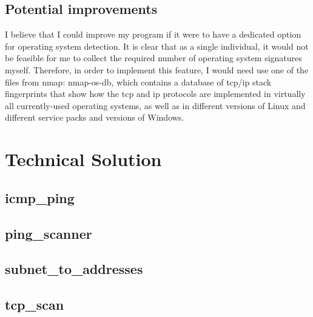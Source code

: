 \documentclass[titlepage]{article}
\let\Oldsection\section{}
\renewcommand{\section}{\clearpage\FloatBarrier\Oldsection}
\let\Oldsubsection\subsection{}
\renewcommand{\subsection}{\FloatBarrier\Oldsubsection}
\begin{document}
\subsection{Potential improvements}
I believe that I could improve my program if it were to have a dedicated option for operating
system detection. 
It is clear that as a single individual, it would not be feasible for me to collect the required
number of operating system signatures myself. Therefore, in order to implement this feature,
I would need use one of the files from nmap: nmap-os-db, which contains
a database of \gls{tcp}/\gls{ip} stack fingerprints that show how the \gls{tcp} and \gls{ip}
protocols are implemented in virtually all currently-used operating systems, as well as in different
versions of Linux and different service packs and versions of Windows.

\appendix

\section{Technical Solution}\label{code}
\lstset{language=Python}
\subsection{icmp\_ping}\label{app:icmpping}



\subsection{ping\_scanner}\label{app:pingscanner}


\subsection{subnet\_to\_addresses}\label{app:subnettoaddresses}


\subsection{tcp\_scan}\label{app:tcpscan}
\end{document}
